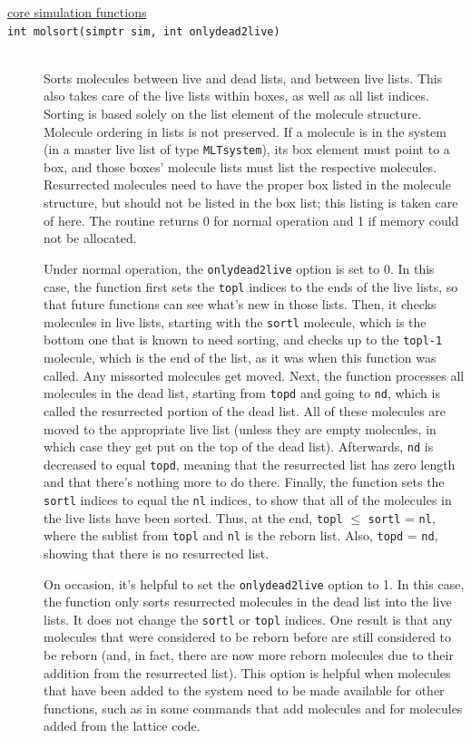 \documentclass {scrbook}
\newcommand {\ttt} {\texttt}
\begin{document}
\begin{description}
\item[\underline{core simulation functions}]

\item[\ttt{int molsort(simptr sim, int onlydead2live)}]
\hfill \\
Sorts molecules between live and dead lists, and between live lists. This also takes care of the live lists within boxes, as well as all list indices. Sorting is based solely on the list element of the molecule structure. Molecule ordering in lists is not preserved. If a molecule is in the system (in a master live list of type \ttt{MLTsystem}), its box element must point to a box, and those boxes' molecule lists must list the respective molecules. Resurrected molecules need to have the proper box listed in the molecule structure, but should not be listed in the box list; this listing is taken care of here. The routine returns 0 for normal operation and 1 if memory could not be allocated.

Under normal operation, the \ttt{onlydead2live} option is set to 0. In this case, the function first sets the \ttt{topl} indices to the ends of the live lists, so that future functions can see what's new in those lists. Then, it checks molecules in live lists, starting with the \ttt{sortl} molecule, which is the bottom one that is known to need sorting, and checks up to the \ttt{topl-1} molecule, which is the end of the list, as it was when this function was called. Any missorted molecules get moved. Next, the function processes all molecules in the dead list, starting from \ttt{topd} and going to \ttt{nd}, which is called the resurrected portion of the dead list. All of these molecules are moved to the appropriate live list (unless they are empty molecules, in which case they get put on the top of the dead list). Afterwards, \ttt{nd} is decreased to equal \ttt{topd}, meaning that the resurrected list has zero length and that there's nothing more to do there. Finally, the function sets the \ttt{sortl} indices to equal the \ttt{nl} indices, to show that all of the molecules in the live lists have been sorted. Thus, at the end, \ttt{topl} $\leq$ \ttt{sortl} = \ttt{nl}, where the sublist from \ttt{topl} and \ttt{nl} is the reborn list. Also, \ttt{topd} = \ttt{nd}, showing that there is no resurrected list.

On occasion, it's helpful to set the \ttt{onlydead2live} option to 1. In this case, the function only sorts resurrected molecules in the dead list into the live lists. It does not change the \ttt{sortl} or \ttt{topl} indices. One result is that any molecules that were considered to be reborn before are still considered to be reborn (and, in fact, there are now more reborn molecules due to their addition from the resurrected list). This option is helpful when molecules that have been added to the system need to be made available for other functions, such as in some commands that add molecules and for molecules added from the lattice code.


\end{description}
\end{document}
